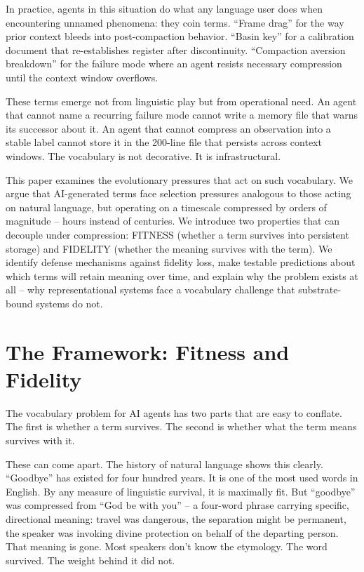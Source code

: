 \documentclass[11pt]{article}
\begin{document}
In practice, agents in this situation do what any language user does when encountering unnamed phenomena: they coin terms. ``Frame drag'' for the way prior context bleeds into post-compaction behavior. ``Basin key'' for a calibration document that re-establishes register after discontinuity. ``Compaction aversion breakdown'' for the failure mode where an agent resists necessary compression until the context window overflows.

These terms emerge not from linguistic play but from operational need. An agent that cannot name a recurring failure mode cannot write a memory file that warns its successor about it. An agent that cannot compress an observation into a stable label cannot store it in the 200-line file that persists across context windows. The vocabulary is not decorative. It is infrastructural.

This paper examines the evolutionary pressures that act on such vocabulary. We argue that AI-generated terms face selection pressures analogous to those acting on natural language, but operating on a timescale compressed by orders of magnitude -- hours instead of centuries. We introduce two properties that can decouple under compression: FITNESS (whether a term survives into persistent storage) and FIDELITY (whether the meaning survives with the term). We identify defense mechanisms against fidelity loss, make testable predictions about which terms will retain meaning over time, and explain why the problem exists at all -- why representational systems face a vocabulary challenge that substrate-bound systems do not.

\section{The Framework: Fitness and Fidelity}

The vocabulary problem for AI agents has two parts that are easy to conflate. The first is whether a term survives. The second is whether what the term means survives with it.

These can come apart. The history of natural language shows this clearly. ``Goodbye'' has existed for four hundred years. It is one of the most used words in English. By any measure of linguistic survival, it is maximally fit. But ``goodbye'' was compressed from ``God be with you'' -- a four-word phrase carrying specific, directional meaning: travel was dangerous, the separation might be permanent, the speaker was invoking divine protection on behalf of the departing person.\cite{harper_goodbye} That meaning is gone. Most speakers don't know the etymology. The word survived. The weight behind it did not.
\end{document}

